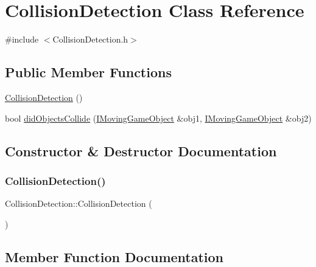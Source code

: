 \hypertarget{class_collision_detection}{}\section{Collision\+Detection Class Reference}
\label{class_collision_detection}


{\ttfamily \#include $<$Collision\+Detection.\+h$>$}

\subsection*{Public Member Functions}
\begin{DoxyCompactItemize}
\item 
\hyperlink{class_collision_detection_ac5b8af06521eccb38b5707209fa175e2}{Collision\+Detection} ()
\item 
bool \hyperlink{class_collision_detection_a8e58e83acc7de60673126754ac2246cd}{did\+Objects\+Collide} (\hyperlink{class_i_moving_game_object}{I\+Moving\+Game\+Object} \&obj1, \hyperlink{class_i_moving_game_object}{I\+Moving\+Game\+Object} \&obj2)
\end{DoxyCompactItemize}


\subsection{Constructor \& Destructor Documentation}
\mbox{\label{class_collision_detection_ac5b8af06521eccb38b5707209fa175e2}} 
\subsubsection{\texorpdfstring{Collision\+Detection()}{CollisionDetection()}}
{\footnotesize\ttfamily Collision\+Detection\+::\+Collision\+Detection (\begin{DoxyParamCaption}{ }\end{DoxyParamCaption})}



\subsection{Member Function Documentation}
\mbox{\label{class_collision_detection_a8e58e83acc7de60673126754ac2246cd}} 
